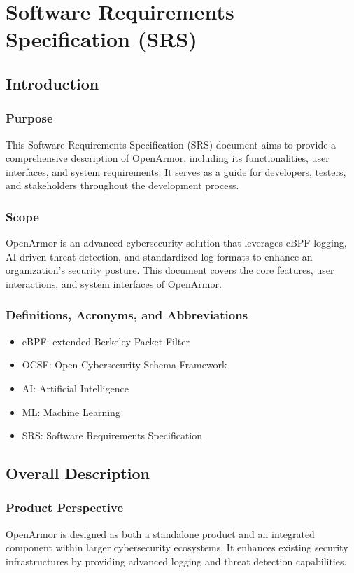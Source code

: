 \chapter{Software Requirements Specification (SRS)}

\section{Introduction}
\subsection{Purpose}
This Software Requirements Specification (SRS) document aims to provide a comprehensive description of OpenArmor, including its functionalities, user interfaces, and system requirements. It serves as a guide for developers, testers, and stakeholders throughout the development process.

\subsection{Scope}
OpenArmor is an advanced cybersecurity solution that leverages eBPF logging, AI-driven threat detection, and standardized log formats to enhance an organization's security posture. This document covers the core features, user interactions, and system interfaces of OpenArmor.

\subsection{Definitions, Acronyms, and Abbreviations}
\begin{itemize}
    \item eBPF: extended Berkeley Packet Filter
    \item OCSF: Open Cybersecurity Schema Framework
    \item AI: Artificial Intelligence
    \item ML: Machine Learning
    \item SRS: Software Requirements Specification
\end{itemize}

\section{Overall Description}
\subsection{Product Perspective}
OpenArmor is designed as both a standalone product and an integrated component within larger cybersecurity ecosystems. It enhances existing security infrastructures by providing advanced logging and threat detection capabilities.


